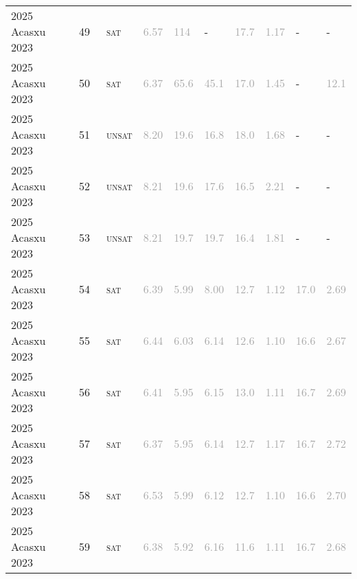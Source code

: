 \begin{center}
{\begin{longtable}{@{}llllllllll@{}}
2025 Acasxu 2023 & 49 & ~\textsc{sat} & \textcolor{darkgray}{6.57} & \textcolor{darkgray}{114} & - & \textcolor{darkgray}{17.7} & \textcolor{darkgray}{1.17} & - & - \\
2025 Acasxu 2023 & 50 & ~\textsc{sat} & \textcolor{darkgray}{6.37} & \textcolor{darkgray}{65.6} & \textcolor{darkgray}{45.1} & \textcolor{darkgray}{17.0} & \textcolor{darkgray}{1.45} & - & \textcolor{darkgray}{12.1} \\
2025 Acasxu 2023 & 51 & ~\textsc{unsat} & \textcolor{darkgray}{8.20} & \textcolor{darkgray}{19.6} & \textcolor{darkgray}{16.8} & \textcolor{darkgray}{18.0} & \textcolor{darkgray}{1.68} & - & - \\
2025 Acasxu 2023 & 52 & ~\textsc{unsat} & \textcolor{darkgray}{8.21} & \textcolor{darkgray}{19.6} & \textcolor{darkgray}{17.6} & \textcolor{darkgray}{16.5} & \textcolor{darkgray}{2.21} & - & - \\
2025 Acasxu 2023 & 53 & ~\textsc{unsat} & \textcolor{darkgray}{8.21} & \textcolor{darkgray}{19.7} & \textcolor{darkgray}{19.7} & \textcolor{darkgray}{16.4} & \textcolor{darkgray}{1.81} & - & - \\
2025 Acasxu 2023 & 54 & ~\textsc{sat} & \textcolor{darkgray}{6.39} & \textcolor{darkgray}{5.99} & \textcolor{darkgray}{8.00} & \textcolor{darkgray}{12.7} & \textcolor{darkgray}{1.12} & \textcolor{darkgray}{17.0} & \textcolor{darkgray}{2.69} \\
2025 Acasxu 2023 & 55 & ~\textsc{sat} & \textcolor{darkgray}{6.44} & \textcolor{darkgray}{6.03} & \textcolor{darkgray}{6.14} & \textcolor{darkgray}{12.6} & \textcolor{darkgray}{1.10} & \textcolor{darkgray}{16.6} & \textcolor{darkgray}{2.67} \\
2025 Acasxu 2023 & 56 & ~\textsc{sat} & \textcolor{darkgray}{6.41} & \textcolor{darkgray}{5.95} & \textcolor{darkgray}{6.15} & \textcolor{darkgray}{13.0} & \textcolor{darkgray}{1.11} & \textcolor{darkgray}{16.7} & \textcolor{darkgray}{2.69} \\
2025 Acasxu 2023 & 57 & ~\textsc{sat} & \textcolor{darkgray}{6.37} & \textcolor{darkgray}{5.95} & \textcolor{darkgray}{6.14} & \textcolor{darkgray}{12.7} & \textcolor{darkgray}{1.17} & \textcolor{darkgray}{16.7} & \textcolor{darkgray}{2.72} \\
2025 Acasxu 2023 & 58 & ~\textsc{sat} & \textcolor{darkgray}{6.53} & \textcolor{darkgray}{5.99} & \textcolor{darkgray}{6.12} & \textcolor{darkgray}{12.7} & \textcolor{darkgray}{1.10} & \textcolor{darkgray}{16.6} & \textcolor{darkgray}{2.70} \\
2025 Acasxu 2023 & 59 & ~\textsc{sat} & \textcolor{darkgray}{6.38} & \textcolor{darkgray}{5.92} & \textcolor{darkgray}{6.16} & \textcolor{darkgray}{11.6} & \textcolor{darkgray}{1.11} & \textcolor{darkgray}{16.7} & \textcolor{darkgray}{2.68} \\

\end{longtable}}
\end{center}
